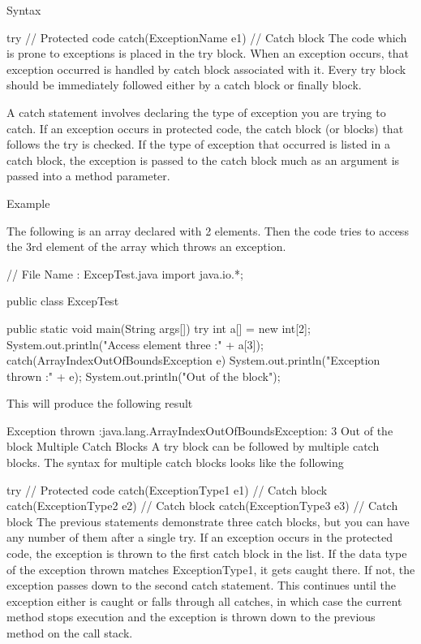Syntax

try {
   // Protected code
}catch(ExceptionName e1) {
   // Catch block
}
The code which is prone to exceptions is placed in the try block. When an exception occurs, that exception occurred is handled by catch block associated with it. Every try block should be immediately followed either by a catch block or finally block.

A catch statement involves declaring the type of exception you are trying to catch. If an exception occurs in protected code, the catch block (or blocks) that follows the try is checked. If the type of exception that occurred is listed in a catch block, the exception is passed to the catch block much as an argument is passed into a method parameter.

Example

The following is an array declared with 2 elements. Then the code tries to access the 3rd element of the array which throws an exception.

// File Name : ExcepTest.java
import java.io.*;

public class ExcepTest {

   public static void main(String args[]) {
      try {
         int a[] = new int[2];
         System.out.println("Access element three :" + a[3]);
      }catch(ArrayIndexOutOfBoundsException e) {
         System.out.println("Exception thrown  :" + e);
      }
      System.out.println("Out of the block");
   }
}
This will produce the following result

Exception thrown  :java.lang.ArrayIndexOutOfBoundsException: 3
Out of the block
Multiple Catch Blocks
A try block can be followed by multiple catch blocks. The syntax for multiple catch blocks looks like the following

try {
   // Protected code
}catch(ExceptionType1 e1) {
   // Catch block
}catch(ExceptionType2 e2) {
   // Catch block
}catch(ExceptionType3 e3) {
   // Catch block
}
The previous statements demonstrate three catch blocks, but you can have any number of them after a single try. If an exception occurs in the protected code, the exception is thrown to the first catch block in the list. If the data type of the exception thrown matches ExceptionType1, it gets caught there. If not, the exception passes down to the second catch statement. This continues until the exception either is caught or falls through all catches, in which case the current method stops execution and the exception is thrown down to the previous method on the call stack.

